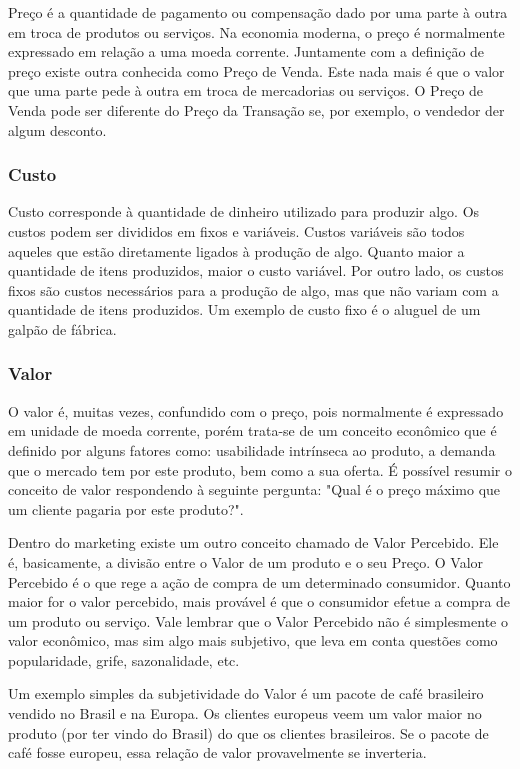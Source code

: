 \documentclass[12pt]{article}
\begin{document}
	Preço é a quantidade de pagamento ou compensação dado por uma parte à outra em troca de produtos ou serviços. Na economia moderna, o preço é normalmente expressado em relação a uma moeda corrente. Juntamente com a definição de preço existe outra conhecida como Preço de Venda. Este nada mais é que o valor que uma parte pede à outra em troca de mercadorias ou serviços. O Preço de Venda pode ser diferente do Preço da Transação se, por exemplo, o vendedor der algum desconto.

\subsubsection{Custo}

	Custo corresponde à quantidade de dinheiro utilizado para produzir algo. Os custos podem ser divididos em fixos e variáveis. Custos variáveis são todos aqueles que estão diretamente ligados à produção de algo. Quanto maior a quantidade de itens produzidos, maior o custo variável. Por outro lado, os custos fixos são custos necessários para a produção de algo, mas que não variam com a quantidade de itens produzidos. Um exemplo de custo fixo é o aluguel de um galpão de fábrica.

\subsubsection{Valor}

	O valor é, muitas vezes, confundido com o preço, pois normalmente é expressado em unidade de moeda corrente, porém trata-se de um conceito econômico que é definido por alguns fatores como: usabilidade intrínseca ao produto, a demanda que o mercado tem por este produto, bem como a sua oferta. É possível resumir o conceito de valor respondendo à seguinte pergunta: "Qual é o preço máximo que um cliente pagaria por este produto?".

	Dentro do marketing existe um outro conceito chamado de Valor Percebido. Ele é, basicamente, a divisão entre o Valor de um produto e o seu Preço. O Valor Percebido é o que rege a ação de compra de um determinado consumidor. Quanto maior for o valor percebido, mais provável é que o consumidor efetue a compra de um produto ou serviço. Vale lembrar que o Valor Percebido não é simplesmente o valor econômico, mas sim algo mais subjetivo, que leva em conta questões como popularidade, grife, sazonalidade, etc.

	Um exemplo simples da subjetividade do Valor é um pacote de café brasileiro vendido no Brasil e na Europa. Os clientes europeus veem um valor maior no produto (por ter vindo do Brasil) do que os clientes brasileiros. Se o pacote de café fosse europeu, essa relação de valor provavelmente se inverteria.
\end{document}
